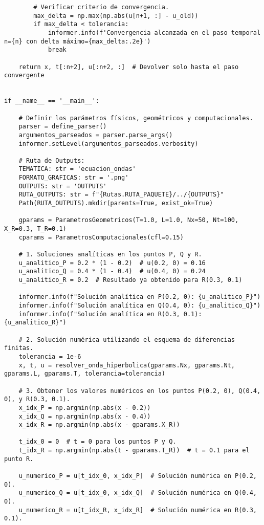 \begin{verbatim}
        # Verificar criterio de convergencia.
        max_delta = np.max(np.abs(u[n+1, :] - u_old))
        if max_delta < tolerancia:
            informer.info(f'Convergencia alcanzada en el paso temporal n={n} con delta máximo={max_delta:.2e}')
            break

    return x, t[:n+2], u[:n+2, :]  # Devolver solo hasta el paso convergente


if __name__ == '__main__':
    
    # Definir los parámetros físicos, geométricos y computacionales.
    parser = define_parser()
    argumentos_parseados = parser.parse_args()
    informer.setLevel(argumentos_parseados.verbosity)
    
    # Ruta de Outputs:
    TEMATICA: str = 'ecuacion_ondas'
    FORMATO_GRAFICAS: str = '.png'
    OUTPUTS: str = 'OUTPUTS'
    RUTA_OUTPUTS: str = f"{Rutas.RUTA_PAQUETE}/../{OUTPUTS}"
    Path(RUTA_OUTPUTS).mkdir(parents=True, exist_ok=True)
    
    gparams = ParametrosGeometricos(T=1.0, L=1.0, Nx=50, Nt=100, X_R=0.3, T_R=0.1)
    cparams = ParametrosComputacionales(cfl=0.15)
    
    # 1. Soluciones analíticas en los puntos P, Q y R.
    u_analitico_P = 0.2 * (1 - 0.2)  # u(0.2, 0) = 0.16
    u_analitico_Q = 0.4 * (1 - 0.4)  # u(0.4, 0) = 0.24
    u_analitico_R = 0.2  # Resultado ya obtenido para R(0.3, 0.1)
    
    informer.info(f"Solución analítica en P(0.2, 0): {u_analitico_P}")
    informer.info(f"Solución analítica en Q(0.4, 0): {u_analitico_Q}")
    informer.info(f"Solución analítica en R(0.3, 0.1): {u_analitico_R}")
    
    # 2. Solución numérica utilizando el esquema de diferencias finitas.
    tolerancia = 1e-6
    x, t, u = resolver_onda_hiperbolica(gparams.Nx, gparams.Nt, gparams.L, gparams.T, tolerancia=tolerancia)
    
    # 3. Obtener los valores numéricos en los puntos P(0.2, 0), Q(0.4, 0), y R(0.3, 0.1).
    x_idx_P = np.argmin(np.abs(x - 0.2))
    x_idx_Q = np.argmin(np.abs(x - 0.4))
    x_idx_R = np.argmin(np.abs(x - gparams.X_R))
    
    t_idx_0 = 0  # t = 0 para los puntos P y Q.
    t_idx_R = np.argmin(np.abs(t - gparams.T_R))  # t = 0.1 para el punto R.
    
    u_numerico_P = u[t_idx_0, x_idx_P]  # Solución numérica en P(0.2, 0).
    u_numerico_Q = u[t_idx_0, x_idx_Q]  # Solución numérica en Q(0.4, 0).
    u_numerico_R = u[t_idx_R, x_idx_R]  # Solución numérica en R(0.3, 0.1).
    

\end{verbatim}
